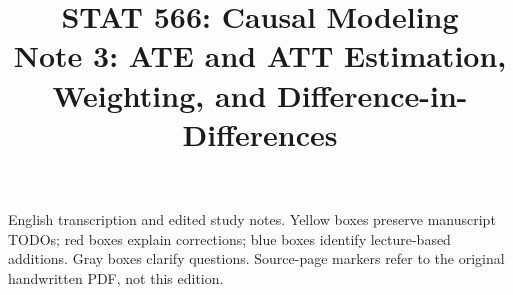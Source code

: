 
\title{STAT 566: Causal Modeling\\[.4em]\large Note 3: ATE and ATT Estimation, Weighting, and Difference-in-Differences}

\maketitle
\begin{remarkbox}
English transcription and edited study notes. Yellow boxes preserve manuscript TODOs; red boxes explain corrections; blue boxes identify lecture-based additions. Gray boxes clarify questions. Source-page markers refer to the original handwritten PDF, not this edition.
\end{remarkbox}
\tableofcontents
\clearpage


